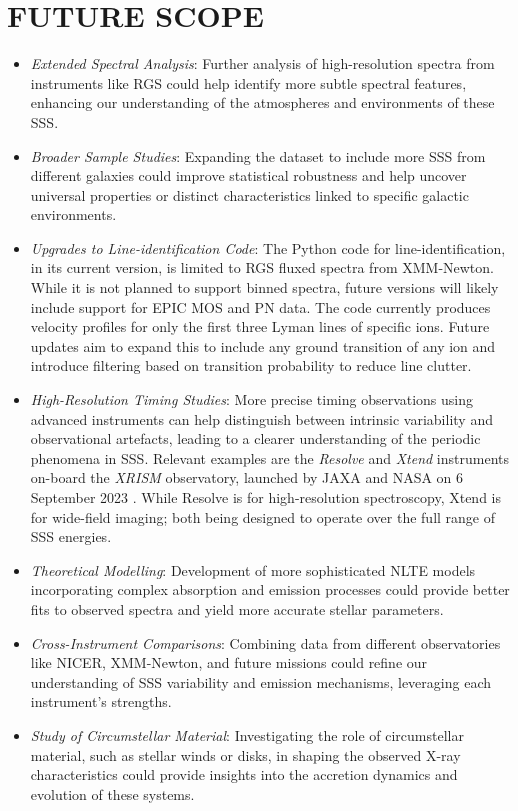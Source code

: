     \section{\MakeUppercase{Future Scope}}
    	\begin{itemize}
    		\item \textit{Extended Spectral Analysis}: Further analysis of high-resolution spectra from instruments like RGS could help identify more subtle spectral features, enhancing our understanding of the atmospheres and environments of these SSS.
    		
    		\item \textit{Broader Sample Studies}: Expanding the dataset to include more SSS from different galaxies could improve statistical robustness and help uncover universal properties or distinct characteristics linked to specific galactic environments.
    		
    		\item \textit{Upgrades to Line-identification Code}: The Python code for line-identification, in its current version, is limited to RGS fluxed spectra from XMM-Newton. While it is not planned to support binned spectra, future versions will likely include support for EPIC MOS and PN data. The code currently produces velocity profiles for only the first three Lyman lines of specific ions. Future updates aim to expand this to include any ground transition of any ion and introduce filtering based on transition probability to reduce line clutter.
    		
    		\item \textit{High-Resolution Timing Studies}: More precise timing observations using advanced instruments can help distinguish between intrinsic variability and observational artefacts, leading to a clearer understanding of the periodic phenomena in SSS. Relevant examples are the \textit{Resolve} and \textit{Xtend} instruments on-board the \textit{XRISM} observatory, launched by JAXA and NASA on 6 September 2023 \cite{tashiro2022xrism}. While Resolve is for high-resolution spectroscopy, Xtend is for wide-field imaging; both being designed to operate over the full range of SSS energies.
    		
    		\item \textit{Theoretical Modelling}: Development of more sophisticated NLTE models incorporating complex absorption and emission processes could provide better fits to observed spectra and yield more accurate stellar parameters.
    		
    		\item \textit{Cross-Instrument Comparisons}: Combining data from different observatories like NICER, XMM-Newton, and future missions could refine our understanding of SSS variability and emission mechanisms, leveraging each instrument's strengths.
    		
    		\item \textit{Study of Circumstellar Material}: Investigating the role of circumstellar material, such as stellar winds or disks, in shaping the observed X-ray characteristics could provide insights into the accretion dynamics and evolution of these systems.
    	\end{itemize}



	\setcounter{footnotecount}{\value{footnote}}